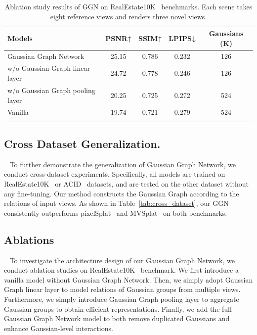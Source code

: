\begin{table}[t]
\centering
\caption{Ablation study results of GGN on RealEstate10K~\cite{RealEstate10K2018} benchmarks. Each scene takes eight reference views and renders three novel views.}
\vspace{0.2cm}
\begin{tabular}{lcccc}
    \toprule
    Models & PSNR↑ & SSIM↑ & LPIPS↓ & Gaussians (K) \\
    \midrule
    Gaussian Graph Network & 25.15 & 0.786 & 0.232 & 126 \\
    w/o Gaussian Graph linear layer & 24.72 & 0.778 & 0.246 & 126 \\
    w/o Gaussian Graph pooling layer & 20.25 & 0.725 & 0.272 & 524 \\
    Vanilla & 19.74 & 0.721 & 0.279 & 524 \\
    \bottomrule
    \vspace{-0.6cm}
\end{tabular}
\label{tab:ablation study}
\end{table}

\subsection{Cross Dataset Generalization.}~\label{sec:cross-dataset exp}
To further demonstrate the generalization of Gaussian Graph Network, we conduct cross-dataset experiments. Specifically, all models are trained on RealEstate10K~\cite{RealEstate10K2018} or ACID~\cite{ACID2021ICCV} datasets, and are tested on the other dataset without any fine-tuning. Our method constructs the Gaussian Graph according to the relations of input views. As shown in Table~\ref{tab:cross_dataset}, our GGN consistently outperforms pixelSplat~\cite{pixelSplat2023arXiv} and MVSplat~\cite{MVSplat2024arXiv} on both benchmarks. 



\subsection{Ablations}~\label{sec:ablation exp}
To investigate the architecture design of our Gaussian Graph Network, we conduct ablation studies on RealEstate10K~\cite{RealEstate10K2018} benchmark. We first introduce a vanilla model without Gaussian Graph Network. Then, we simply adopt Gaussian Graph linear layer to model relations of Gaussian groups from multiple views. Furthermore, we simply introduce Gaussian Graph pooling layer to aggregate Gaussian groups to obtain efficient representations. Finally, we add the full Gaussian Graph Network model to both remove duplicated Gaussians and enhance Gaussian-level interactions.

